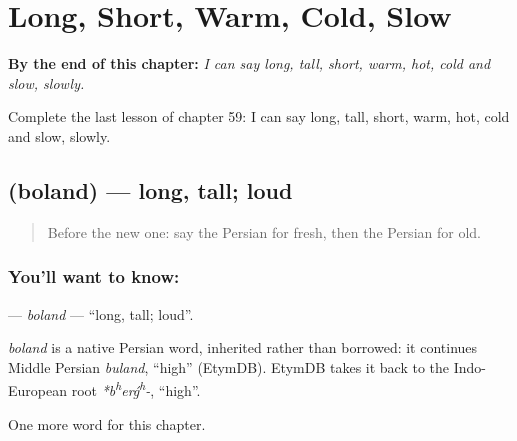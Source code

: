 
\chapter{Long, Short, Warm, Cold, Slow}
\label{ch:fa-long-short-warm-cold-slow}

\begin{chapteropening}
\textbf{By the end of this chapter:} \emph{I can say long, tall, short, warm, hot, cold and slow, slowly.}

Complete the last lesson of chapter 59: I can say long, tall, short, warm, hot, cold and slow, slowly.
\end{chapteropening}

\section[\texorpdfstring{\fa{بلند} (boland)}{بلند (boland)}]{ (boland) — long, tall; loud}

\label{lesson:FA-C59-boland}



\begin{quote}
Before the new one: say the Persian for fresh, then the Persian for old.
\end{quote}

\subsection*{You'll want to know: }
\textbf{} — \emph{boland} — \textquotedblleft{}long, tall; loud\textquotedblright{}.

\begin{cousinweb}
\emph{boland} is a native Persian word, inherited rather than borrowed: it continues Middle Persian \emph{buland}, \textquotedblleft{}high\textquotedblright{} (EtymDB). EtymDB takes it back to the Indo-European root \emph{*b\textsuperscript{h}erǵ\textsuperscript{h}-}, \textquotedblleft{}high\textquotedblright{}.
\end{cousinweb}

\begin{grammarlens}[title={What you've built}]
One more word for this chapter.
\end{grammarlens}

